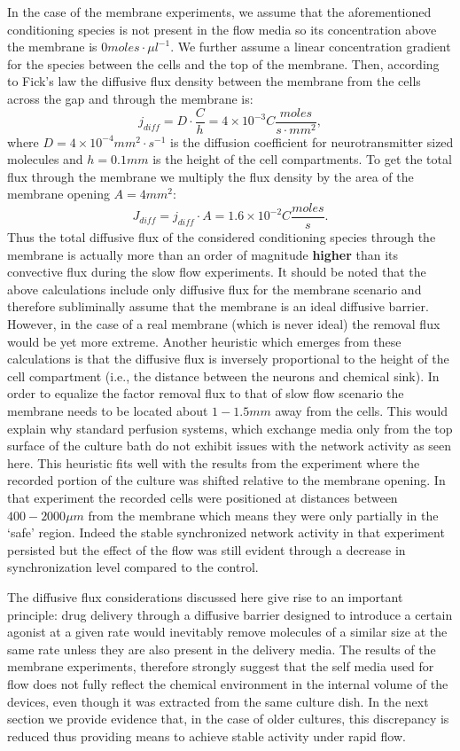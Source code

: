         In the case of the membrane experiments, we assume that the aforementioned conditioning species is not present in the flow media so its concentration above the membrane is \(0 moles\cdot \mu l^{-1}\). We further assume a linear concentration gradient for the species between the cells and the top of the membrane. Then, according to Fick's law the diffusive flux density between the membrane from the cells across the gap and through the membrane is: \[j_{diff}=D\cdot\frac{C}{h}=4\times 10^{-3}C \frac{moles}{s\cdot mm^{2}},\] where \(D=4\times 10^{-4} mm^2\cdot s^{-1}\) is the diffusion coefficient for neurotransmitter sized molecules and \(h=0.1 mm\) is the height of the cell compartments. To get the total flux through the membrane we multiply the flux density by the area of the membrane opening \(A=4 mm^{2}\): \[J_{diff}=j_{diff}\cdot A=1.6\times 10^{-2}C\frac{moles}{s}.\] Thus the total diffusive flux of the considered conditioning species through the membrane is actually more than an order of magnitude \textbf{higher} than its convective flux during the slow flow experiments. It should be noted that the above calculations include only diffusive flux for the membrane scenario and therefore subliminally assume that the membrane is an ideal diffusive barrier. However, in the case of a real membrane (which is never ideal) the removal flux would be yet more extreme. Another heuristic which emerges from these calculations is that the diffusive flux is inversely proportional to the height of the cell compartment (i.e., the distance between the neurons and chemical sink). In order to equalize the factor removal flux to that of slow flow scenario the membrane needs to be located about \(1-1.5 mm\) away from the cells. This would explain why standard perfusion systems, which exchange media only from the top surface of the culture bath do not exhibit issues with the network activity as seen here. This heuristic fits well with the results from the experiment where the recorded portion of the culture was shifted relative to the membrane opening. In that experiment the recorded cells were positioned at distances between \(400-2000\mu m\) from the membrane which means they were only partially in the `safe' region. Indeed the stable synchronized network activity in that experiment persisted but the effect of the flow was still evident through a decrease in synchronization level compared to the control.

        The diffusive flux considerations discussed here give rise to an important principle: drug delivery through a diffusive barrier designed to introduce a certain agonist at a given rate would inevitably remove molecules of a similar size at the same rate unless they are also present in the delivery media. The results of the membrane experiments, therefore strongly suggest that the self media used for flow does not fully reflect the chemical environment in the internal volume of the devices, even though it was extracted from the same culture dish. In the next section we provide evidence that, in the case of older cultures, this discrepancy is reduced thus providing means to achieve stable activity under rapid flow.

